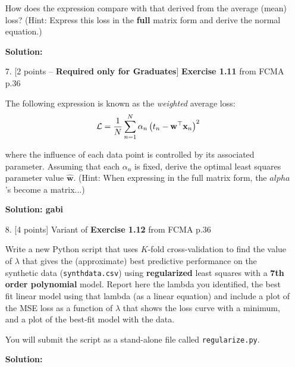 \documentclass[10pt]{article}
\begin{document}
\begin{itemize}
How does the expression compare with that derived from the average (mean) loss?  (Hint: Express this loss in the {\bf full} matrix form and derive the normal equation.)

{\bf Solution:} 


\item[7.] [2 points -- {\bf Required only for Graduates}]
{\bf Exercise 1.11} from FCMA p.36

The following expression is known as the {\em weighted} average loss:
\begin{eqnarray*}
\mathcal{L} = {1 \over N} \sum_{n=1}^N \alpha_n \left( t_n - \mathbf{w}^\top \mathbf{x}_n \right)^2
\end{eqnarray*}

where the influence of each data point is controlled by its associated parameter.  Assuming that each $\alpha_n$ is fixed, derive the optimal least squares parameter value $\mathbf{\hat{w}}$.  (Hint: When expressing in the full matrix form, the $alpha$'s become a matrix...)

{\bf Solution: gabi} 


\item[8.] [4 points]
Variant of {\bf Exercise 1.12} from FCMA p.36

Write a new Python script that uses $K$-fold cross-validation to find the value of $\lambda$ that gives the (approximate) best predictive performance on the synthetic data ({\tt synthdata.csv}) using {\bf regularized} least squares with a {\bf 7th order polynomial} model.  Report here the lambda you identified, the best fit linear model using that lambda (as a linear equation) and include a plot of the MSE loss as a function of $\lambda$ that shows the loss curve with a minimum, and a plot of the best-fit model with the data.

You will submit the script as a stand-alone file called {\tt regularize.py}.

{\bf Solution:} 



\end{itemize}
\end{document}

